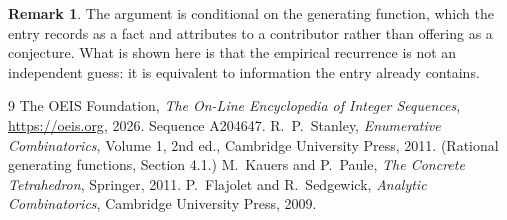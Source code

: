 \documentclass[11pt,a4paper]{article}
\theoremstyle{plain}
\theoremstyle{definition}
\newtheorem{remark}[theorem]{Remark}
\begin{document}
\begin{remark}
The argument is conditional on the generating function, which the entry records as a fact and
attributes to a contributor rather than offering as a conjecture. What is shown here is that
the empirical recurrence is not an independent guess: it is equivalent to information the
entry already contains.
\end{remark}

\begin{thebibliography}{9}
 The OEIS Foundation, \emph{The On-Line Encyclopedia of Integer
Sequences}, \url{https://oeis.org}, 2026. Sequence A204647.
 R.~P.~Stanley, \emph{Enumerative Combinatorics}, Volume 1, 2nd ed.,
Cambridge University Press, 2011. (Rational generating functions, Section 4.1.)
 M.~Kauers and P.~Paule, \emph{The Concrete Tetrahedron}, Springer, 2011.
 P.~Flajolet and R.~Sedgewick, \emph{Analytic Combinatorics}, Cambridge
University Press, 2009.
\end{thebibliography}
\end{document}

